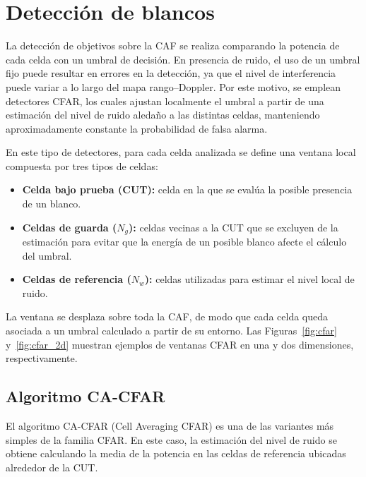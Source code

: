 \section{Detección de blancos}

La detección de objetivos sobre la CAF se realiza comparando la potencia de cada celda con un umbral de decisión. En presencia de ruido, el uso de un umbral fijo puede resultar en errores en la detección, ya que el nivel de interferencia puede variar a lo largo del mapa rango--Doppler. Por este motivo, se emplean detectores CFAR, los cuales ajustan localmente el umbral a partir de una estimación del nivel de ruido aledaño a las distintas celdas, manteniendo aproximadamente constante la probabilidad de falsa alarma.

En este tipo de detectores, para cada celda analizada se define una ventana local compuesta por tres tipos de celdas:

\begin{itemize}
    \item \textbf{Celda bajo prueba (CUT):} celda en la que se evalúa la posible presencia de un blanco.
    \item \textbf{Celdas de guarda (\(N_g\)):} celdas vecinas a la CUT que se excluyen de la estimación para evitar que la energía de un posible blanco afecte el cálculo del umbral.
    \item \textbf{Celdas de referencia (\(N_w\)):} celdas utilizadas para estimar el nivel local de ruido.
\end{itemize}

La ventana se desplaza sobre toda la CAF, de modo que cada celda queda asociada a un umbral calculado a partir de su entorno. Las Figuras~\ref{fig:cfar} y~\ref{fig:cfar_2d} muestran ejemplos de ventanas CFAR en una y dos dimensiones, respectivamente.



\subsection{Algoritmo CA-CFAR}

El algoritmo CA-CFAR (Cell Averaging CFAR) es una de las variantes más simples de la familia CFAR. En este caso, la estimación del nivel de ruido se obtiene calculando la media de la potencia en las celdas de referencia ubicadas alrededor de la CUT.

